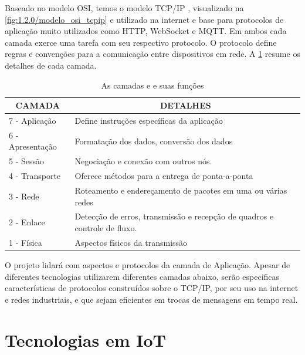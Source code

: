 Baseado no modelo OSI, temos o modelo TCP/IP \cite{TCPIP}, visualizado na \ref{fig:1.2.0/modelo_osi_tcpip} e utilizado na internet e base para protocolos de aplicação muito utilizados como HTTP, WebSocket e MQTT. Em ambos cada camada exerce uma tarefa com seu respectivo protocolo. O protocolo define regras e convenções para a comunicação entre dispositivos em rede. A \ref{table:1.2.0} resume os detalhes de cada camada.

\begin{table}[h]
\centering
\caption{As camadas e e suas funções}
\begin{tabular}{|l|l|}
\hline
\multicolumn{1}{|c|}{CAMADA} & \multicolumn{1}{c|}{DETALHES}                                                  \\ \hline
7 - Aplicação                & Define instruções específicas da aplicação          						    \\ \hline
6 - Apresentação             & Formatação dos dados, conversão dos dados                     					\\ \hline
5 - Sessão                   & Negociação e conexão com outros nós.                                \\ \hline
4 - Transporte               & Oferece métodos para a entrega de ponta-a-ponta                        			\\ \hline
3 - Rede                     & Roteamento e endereçamento de pacotes em uma ou várias redes                                 \\ \hline
2 - Enlace                   & Detecção de erros, transmissão e recepção de quadros e controle de fluxo.                                                          \\ \hline
1 - Física                   & Aspectos físicos da transmissão \\ \hline
\end{tabular}
\label{table:1.2.0}
\end{table}


O projeto lidará com aspectos e protocolos da camada de Aplicação. Apesar de diferentes tecnologias utilizarem diferentes camadas abaixo, serão especificas características de protocolos construídos sobre o TCP/IP, por seu uso na internet e redes industriais, e que sejam eficientes em trocas de mensagens em tempo real.

\section{Tecnologias em IoT}
\label{section:tecnologias_iot}

